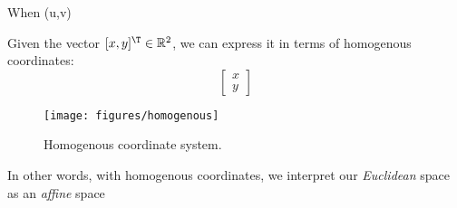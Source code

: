 When
(u,v)


Given the vector $[x, y]^\T \in \mathbb{R}^2$, we can express it in terms of homogenous coordinates: 
\begin{equation}
    \begin{bmatrix}
        x \\ y
    \end{bmatrix}
\end{equation}

\begin{figure}[H]
    \centering
    \texttt{[image: figures/homogenous]}
    \caption{Homogenous coordinate system.}
\end{figure}

In other words, with homogenous coordinates, we interpret our \emph{Euclidean} space as an \emph{affine} space
